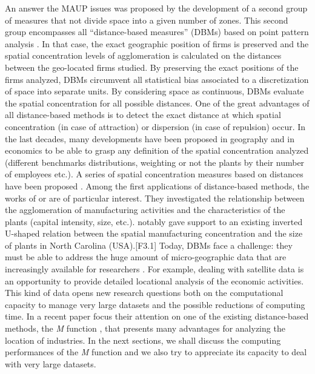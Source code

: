\documentclass[fleqn,10pt]{latex/stylish_article} %
\begin{document}
An answer the MAUP issues was proposed by the development of a second group of measures that not divide space into a given number of zones.
This second group encompasses all \enquote{distance-based measures} (DBMs) based on point pattern analysis \citep{Marcon2017}.
In that case, the exact geographic position of firms is preserved and the spatial concentration levels of agglomeration is calculated on the distances between the geo-located firms studied.
By preserving the exact positions of the firms analyzed, DBMs circumvent all statistical bias associated to a discretization of space into separate units.
By considering space as continuous, DBMs evaluate the spatial concentration for all possible distances.
One of the great advantages of all distance-based methods is to detect the exact distance at which spatial concentration (in case of attraction) or dispersion (in case of repulsion) occur.
In the last decades, many developments have been proposed in geography and in economics to be able to grasp any definition of the spatial concentration analyzed (different benchmarks distributions, weighting or not the plants by their number of employees etc.).
A series of spatial concentration measures based on distances have been proposed \citep[ proposed a typology of around a dozen of existing DBMs]{Marcon2017}. Among the first applications of distance-based methods, the works of \citet{Barff1987} or \citet{Sweeney1998} are of particular interest. They investigated the relationship between the agglomeration of manufacturing activities and the characteristics of the plants (capital intensity, size, etc.). \citet{Sweeney1998} notably gave support to an existing inverted U-shaped relation between the spatial manufacturing concentration and the size of plants in North Carolina (USA).{[}F3.1{]} Today, DBMs face a challenge: they must be able to address the huge amount of micro-geographic data that are increasingly available for researchers \citep{Piacentino2021}.
For example, dealing with satellite data \citep[\citet{Daspremont2025}, \citet{Baragwanath2026}]{Bachtrogleunger2023} is an opportunity to provide detailed locational analysis of the economic activities.
This kind of data opens new research questions both on the computational capacity to manage very large datasets and the possible reductions of computing time.
In a recent paper \citet{Tidu2023} focus their attention on one of the existing distance-based methods, the \emph{M} function \citep{Marcon2010}, that presents many advantages for analyzing the location of industries.
In the next sections, we shall discuss the computing performances of the \emph{M} function and we also try to appreciate its capacity to deal with very large datasets.
\end{document}
